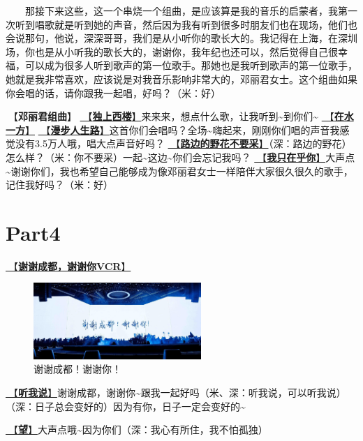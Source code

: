 \documentclass[]{ctexbook}
\begin{document}
  那接下来这些，这一个串烧一个组曲，是应该算是我的音乐的启蒙者，我第一次听到唱歌就是听到她的声音，然后因为我有听到很多时朋友们也在现场，他们也会说那句，他说，深深哥哥，我们是从小听你的歌长大的。我记得在上海，在深圳场，你也是从小听我的歌长大的，谢谢你，我年纪也还可以，然后觉得自己很幸福，可以成为很多人听到歌声的第一位歌手。那她也是我听到歌声的第一位歌手，她就是我非常喜欢，应该说是对我音乐影响非常大的，邓丽君女士。这个组曲如果你会唱的话，请你跟我一起唱，好吗？（米：好）

🎵【\textbf{邓丽君组曲}】
\hyperref[one-in-the-building]{🎵【\textbf{独上西楼}】}来来来，想点什么歌，让我听到\textasciitilde 到你们\textasciitilde{}
\hyperref[on-the-water-side]{🎵【\textbf{在水一方}】}
\hyperref[walk-the-road-of-life]{🎵【\textbf{漫步人生路}】}这首你们会唱吗？全场\textasciitilde 嗨起来，刚刚你们唱的声音我感觉没有3.5万人哦，唱大点声音好吗？
\hyperref[only-with-me]{🎵【\textbf{路边的野花不要采}】}（深：路边的野花）怎么样？（米：你不要采）一起\textasciitilde 这边\textasciitilde 你们会忘记我吗？
\hyperref[only-you]{🎵【\textbf{我只在乎你}】}大声点\textasciitilde 谢谢你们，我也希望自己能够成为像邓丽君女士一样陪伴大家很久很久的歌手，记住我好吗？（米：好）

\section{Part4}\label{chengdu-20240615-part4}

\hyperref[thank-you-vcr]{🎥【\textbf{谢谢成都，谢谢你VCR}】}

\begin{figure}

{\centering \includegraphics[width=180pt]{img/chengdu20240615/thank-chengdu} 

}

\caption{谢谢成都！谢谢你！}\label{fig:unnamed-chunk-48}
\end{figure}

\hyperref[listen-to-me]{🎵【\textbf{听我说}】}谢谢成都，谢谢你\textasciitilde 跟我一起好吗（米、深：听我说，可以听我说）（深：日子总会变好的）因为有你，日子一定会变好的\textasciitilde{}

\hyperref[hope]{🎵【\textbf{望}】}大声点哦\textasciitilde 因为你们（深：我心有所住，我不怕孤独）
\end{document}
